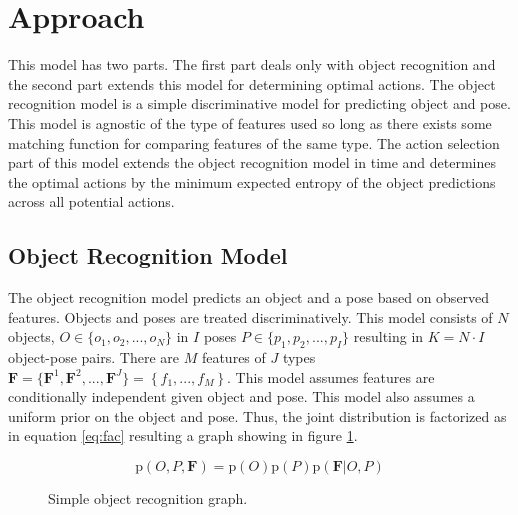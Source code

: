 \documentclass[conference]{IEEEtran}
\newcommand{\prob}[1]{\text{p}(#1)} %
\newcommand{\set}[1]{\mathbf{#1}} %
\begin{document}
\section{Approach}
    This model has two parts. The first part deals only with object recognition and the second part extends this model for determining optimal actions. The object recognition model is a simple discriminative model for predicting object and pose. This model is agnostic of the type of features used so long as there exists some matching function for comparing features of the same type. The action selection part of this model extends the object recognition model in time and determines the optimal actions by the minimum expected entropy of the object predictions across all potential actions. 

    \subsection{Object Recognition Model}
        The object recognition model predicts an object and a pose based on observed features. Objects and poses are treated discriminatively. This model consists of $N$ objects, $O \in \{o_1,o_2, ..., o_N\}$ in $I$ poses $P \in \{p_1,p_2, ..., p_I\}$ resulting in $K = N \cdot I$ object-pose pairs. There are $M$ features of $J$ types $\set{F} = \{\set{F}^1,\set{F}^2, ..., \set{F}^J\} = \left\{ f_1, ...,  f_M\right\}$. This model assumes features are conditionally independent given object and pose. This model also assumes a uniform prior on the object and pose. Thus, the joint distribution is factorized as in equation \ref{eq:fac} resulting a graph showing in figure \ref{fig:simpleGraph}.

        \begin{equation}
            \label{eq:fac}
            \prob{O,P,\set{F}} = \prob{O}\prob{P}\prob{\set{F}|O,P}
        \end{equation}

        \begin{figure}[h]
          \centering
          \caption{Simple object recognition graph.}
          \label{fig:simpleGraph}
        \end{figure}
\end{document}
